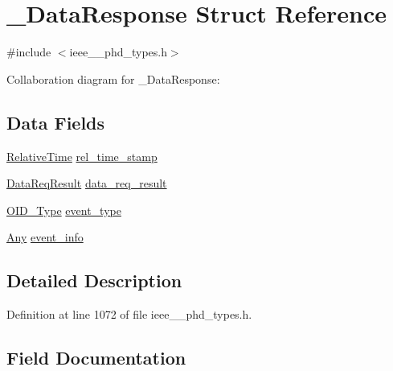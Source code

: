 \hypertarget{struct___data_response}{}\section{\+\_\+\+Data\+Response Struct Reference}
\label{struct___data_response}


{\ttfamily \#include $<$ieee\+\_\+\_\+phd\+\_\+types.\+h$>$}



Collaboration diagram for \+\_\+\+Data\+Response\+:
\subsection*{Data Fields}
\begin{DoxyCompactItemize}
\item 
\hyperlink{ieee__11073__phd__types_8h_a396922eed4599fd81cd463e5c941eb03}{Relative\+Time} \hyperlink{struct___data_response_adf9db611c5d3fadb076adae77ed51f52}{rel\+\_\+time\+\_\+stamp}
\item 
\hyperlink{ieee__11073__phd__types_8h_a1704f8f986a254596d6bc8b8f64f708a}{Data\+Req\+Result} \hyperlink{struct___data_response_adf6c96e13557345ce1626a9812e070fa}{data\+\_\+req\+\_\+result}
\item 
\hyperlink{ieee__11073__phd__types_8h_aa4d7af235d4a95d6632aa0d64160dd62}{O\+I\+D\+\_\+\+Type} \hyperlink{struct___data_response_a9291df89a9ec8bde547d68f86d3e6d75}{event\+\_\+type}
\item 
\hyperlink{ieee__11073__phd__types_8h_a4decf91c0c44a2ed84549e41307f5fdb}{Any} \hyperlink{struct___data_response_a1107e2194d047e7435991af97a9fa56c}{event\+\_\+info}
\end{DoxyCompactItemize}


\subsection{Detailed Description}


Definition at line 1072 of file ieee\+\_\+\_\+phd\+\_\+types.\+h.



\subsection{Field Documentation}
\hypertarget{struct___data_response_adf6c96e13557345ce1626a9812e070fa}{}
